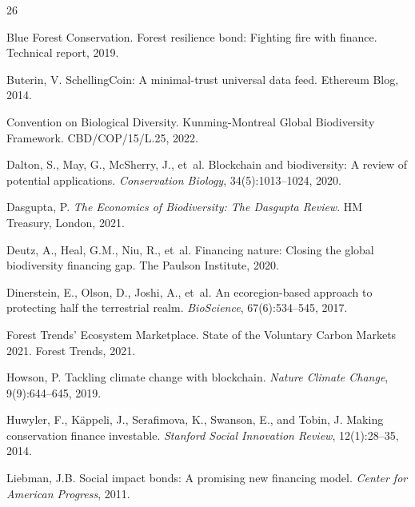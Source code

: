 \begin{thebibliography}{26}

Blue Forest Conservation.
\newblock Forest resilience bond: Fighting fire with finance.
\newblock Technical report, 2019.

Buterin, V.
\newblock SchellingCoin: A minimal-trust universal data feed.
\newblock Ethereum Blog, 2014.

Convention on Biological Diversity.
\newblock Kunming-Montreal Global Biodiversity Framework.
\newblock CBD/COP/15/L.25, 2022.

Dalton, S., May, G., McSherry, J., et~al.
\newblock Blockchain and biodiversity: A review of potential applications.
\newblock \emph{Conservation Biology}, 34(5):1013--1024, 2020.

Dasgupta, P.
\newblock \emph{The Economics of Biodiversity: The Dasgupta Review}.
\newblock HM Treasury, London, 2021.

Deutz, A., Heal, G.M., Niu, R., et~al.
\newblock Financing nature: Closing the global biodiversity financing gap.
\newblock The Paulson Institute, 2020.

Dinerstein, E., Olson, D., Joshi, A., et~al.
\newblock An ecoregion-based approach to protecting half the terrestrial realm.
\newblock \emph{BioScience}, 67(6):534--545, 2017.

Forest Trends' Ecosystem Marketplace.
\newblock State of the Voluntary Carbon Markets 2021.
\newblock Forest Trends, 2021.

Howson, P.
\newblock Tackling climate change with blockchain.
\newblock \emph{Nature Climate Change}, 9(9):644--645, 2019.

Huwyler, F., K{\"a}ppeli, J., Serafimova, K., Swanson, E., and Tobin, J.
\newblock Making conservation finance investable.
\newblock \emph{Stanford Social Innovation Review}, 12(1):28--35, 2014.

Liebman, J.B.
\newblock Social impact bonds: A promising new financing model.
\newblock \emph{Center for American Progress}, 2011.


\end{thebibliography}
